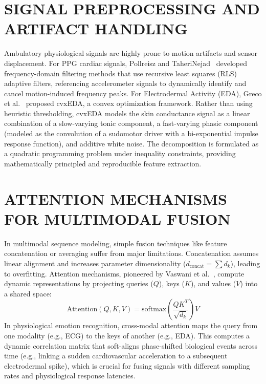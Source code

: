 \documentclass[12pt, a4paper]{report}
\numberwithin{equation}{chapter}
\begin{document}
\section{SIGNAL PREPROCESSING AND ARTIFACT HANDLING}
Ambulatory physiological signals are highly prone to motion artifacts and sensor displacement. For PPG cardiac signals, Pollreisz and TaheriNejad~\cite{pollreisz2019detection} developed frequency-domain filtering methods that use recursive least squares (RLS) adaptive filters, referencing accelerometer signals to dynamically identify and cancel motion-induced frequency peaks. For Electrodermal Activity (EDA), Greco et al.~\cite{greco2017force} proposed cvxEDA, a convex optimization framework. Rather than using heuristic thresholding, cvxEDA models the skin conductance signal as a linear combination of a slow-varying tonic component, a fast-varying phasic component (modeled as the convolution of a sudomotor driver with a bi-exponential impulse response function), and additive white noise. The decomposition is formulated as a quadratic programming problem under inequality constraints, providing mathematically principled and reproducible feature extraction.

\section{ATTENTION MECHANISMS FOR MULTIMODAL FUSION}
In multimodal sequence modeling, simple fusion techniques like feature concatenation or averaging suffer from major limitations. Concatenation assumes linear alignment and increases parameter dimensionality ($d_{\text{concat}} = \sum d_k$), leading to overfitting. Attention mechanisms, pioneered by Vaswani et al.~\cite{vaswani2017attention}, compute dynamic representations by projecting queries ($Q$), keys ($K$), and values ($V$) into a shared space:
\begin{equation}
\text{Attention}(Q, K, V) = \text{softmax}\left(\frac{QK^T}{\sqrt{d_k}}\right) V
\end{equation}
In physiological emotion recognition, cross-modal attention maps the query from one modality (e.g., ECG) to the keys of another (e.g., EDA). This computes a dynamic correlation matrix that soft-aligns phase-shifted biological events across time (e.g., linking a sudden cardiovascular acceleration to a subsequent electrodermal spike), which is crucial for fusing signals with different sampling rates and physiological response latencies.
\end{document}
